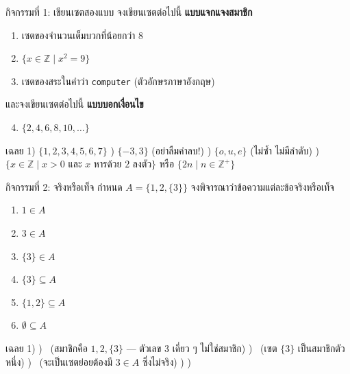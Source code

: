 \begin{frame}{กิจกรรมที่ 1: เขียนเซตสองแบบ }
  จงเขียนเซตต่อไปนี้ \textbf{แบบแจกแจงสมาชิก}
  \begin{enumerate}
    \item เซตของจำนวนเต็มบวกที่น้อยกว่า 8
    \item $\{x \in \mathbb{Z} \mid x^2 = 9\}$
    \item เซตของสระในคำว่า \texttt{computer} (ตัวอักษรภาษาอังกฤษ)
  \end{enumerate}
  และจงเขียนเซตต่อไปนี้ \textbf{แบบบอกเงื่อนไข}
  \begin{enumerate}
    \setcounter{enumi}{3}
    \item $\{2, 4, 6, 8, 10, \ldots\}$
  \end{enumerate}
  \pause
  \begin{exampleblock}{เฉลย}
    \footnotesize
    1) $\{1, 2, 3, 4, 5, 6, 7\}$ ) $\{-3, 3\}$ (อย่าลืมค่าลบ!) ) $\{o, u, e\}$ (ไม่ซ้ำ ไม่มีลำดับ) ) $\{x \in \mathbb{Z} \mid x > 0 \text{ และ } x \text{ หารด้วย 2 ลงตัว}\}$ หรือ $\{2n \mid n \in \mathbb{Z}^+\}$
  \end{exampleblock}
\end{frame}

\begin{frame}{กิจกรรมที่ 2: จริงหรือเท็จ }
  กำหนด $A = \{1, 2, \{3\}\}$ จงพิจารณาว่าข้อความแต่ละข้อจริงหรือเท็จ
  \begin{enumerate}
    \item $1 \in A$
    \item $3 \in A$
    \item $\{3\} \in A$
    \item $\{3\} \subseteq A$
    \item $\{1, 2\} \subseteq A$
    \item $\emptyset \subseteq A$
  \end{enumerate}
  \pause
  \begin{exampleblock}{เฉลย}
    \footnotesize
    1) \TT {}) \FF\ (สมาชิกคือ $1, 2, \{3\}$ --- ตัวเลข 3 เดี่ยว ๆ ไม่ใช่สมาชิก) ) \TT\ (เซต $\{3\}$ เป็นสมาชิกตัวหนึ่ง) ) \FF\ (จะเป็นเซตย่อยต้องมี $3 \in A$ ซึ่งไม่จริง) ) \TT {}) \TT
  \end{exampleblock}
\end{frame}

